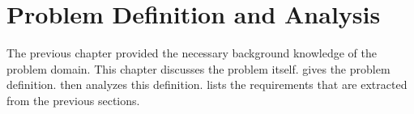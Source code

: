 \chapter{Problem Definition and Analysis}
\label{cha:probl-defin-analys}

The previous chapter provided the necessary background knowledge of the problem
domain. This chapter discusses the problem itself.
 gives the problem definition.
 then analyzes this definition.
 lists the requirements that are extracted from
the previous sections.





